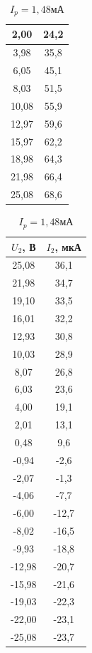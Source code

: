\documentclass[a4paper]{article}
\begin{document}
\begin{table}[!h]
\begin{floatrow}
{\begin{tabular}{|c|c|}
2,00       & 24,2      \\ \hline
3,98    & 35,8      \\ \hline
6,05    & 45,1      \\ \hline
8,03    & 51,5      \\ \hline
10,08   & 55,9      \\ \hline
12,97   & 59,6      \\ \hline
15,97   & 62,2      \\ \hline
18,98   & 64,3      \\ \hline
21,98   & 66,4      \\ \hline
25,08   & 68,6      \\ \hline
\end{tabular}
\caption{$I_p = 3$мА}
    }
   \ttabbox[\FBwidth]{}%
           {
\begin{tabular}{|c|c|}
\hline
$U_2$, В &$ I_2$, мкА \\ \hline
25,08   & 36,1        \\ \hline
21,98   & 34,7      \\ \hline
19,10    & 33,5      \\ \hline
16,01   & 32,2      \\ \hline
12,93   & 30,8      \\ \hline
10,03   & 28,9      \\ \hline
8,07    & 26,8      \\ \hline
6,03    & 23,6      \\ \hline
4,00      & 19,1        \\ \hline
2,01    & 13,1      \\ \hline
0,48    & 9,6       \\ \hline
-0,94   & -2,6      \\ \hline
-2,07   & -1,3      \\ \hline
-4,06   & -7,7      \\ \hline
-6,00      & -12,7     \\ \hline
-8,02   & -16,5     \\ \hline
-9,93   & -18,8     \\ \hline
-12,98  & -20,7     \\ \hline
-15,98  & -21,6     \\ \hline
-19,03  & -22,3     \\ \hline
-22,00     & -23,1       \\ \hline
-25,08  & -23,7     \\ \hline
\end{tabular}
\caption{$I_p = 1,48$мА}
           }
\end{floatrow}
\end{table}
\end{document}
